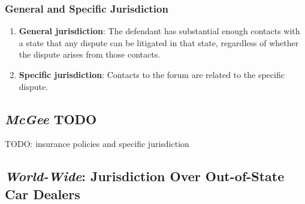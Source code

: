 \subsubsection{General and Specific Jurisdiction}

\begin{enumerate}
    \item \textbf{General jurisdiction}: The defendant has substantial enough 
    contacts with a state that any dispute can be litigated in that state, 
    regardless of whether the dispute arises from those contacts.
    \item \textbf{Specific jurisdiction}: Contacts to the forum are related to 
    the specific dispute.
\end{enumerate}

\subsection{\emph{McGee} TODO}

TODO: insurance policies and specific jurisdiction

\subsection{\emph{World-Wide}: Jurisdiction Over Out-of-State Car Dealers}

